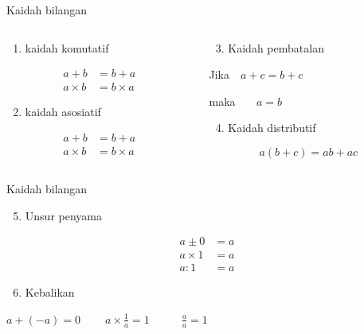 \documentclass[
  ignorenonframetext,
]{beamer}
\providecommand{\tightlist}{%
  \setlength{\itemsep}{0pt}\setlength{\parskip}{0pt}}\usepackage{longtable,booktabs,array}
\begin{document}
\begin{frame}{Kaidah bilangan}
\label{kaidah-bilangan}
\begin{columns}[T]
\begin{column}{0.47\textwidth}
\begin{enumerate}
\tightlist
\item
  kaidah komutatif
\end{enumerate}

\[
\begin{align}
a+b&=b+a \\
a \times b &= b \times a
\end{align}
\]

\begin{enumerate}
\setcounter{enumi}{1}
\tightlist
\item
  kaidah asosiatif
\end{enumerate}

\[
\begin{align}
a+b&=b+a \\
a \times b &= b \times a 
\end{align}
\]
\end{column}

\begin{column}{0.47\textwidth}
\begin{enumerate}
\setcounter{enumi}{2}
\tightlist
\item
  Kaidah pembatalan
\end{enumerate}

Jika \(\ \ \ a+c = b+c\)

maka \(\ \ \ \ \ \ \ a = b\)

\begin{enumerate}
\setcounter{enumi}{3}
\tightlist
\item
  Kaidah distributif
\end{enumerate}

\[
a(b+c)=ab+ac
\]
\end{column}
\end{columns}
\end{frame}

\begin{frame}{Kaidah bilangan}
\label{kaidah-bilangan-1}
\begin{enumerate}
\setcounter{enumi}{4}
\tightlist
\item
  Unsur penyama
\end{enumerate}

\[
\begin{align*}
a \pm 0 &= a \\
a \times 1 &= a \\
a : 1 &= a
\end{align*}
\]

\begin{enumerate}
\setcounter{enumi}{5}
\tightlist
\item
  Kebalikan
\end{enumerate}

\(a+(-a)=0 \ \ \ \ \ \ \ \ \ \ a \times \frac{1}{a}=1 \ \ \ \ \ \ \ \ \ \ \ \ \ \frac{a}{a}=1\)
\end{frame}
\end{document}
